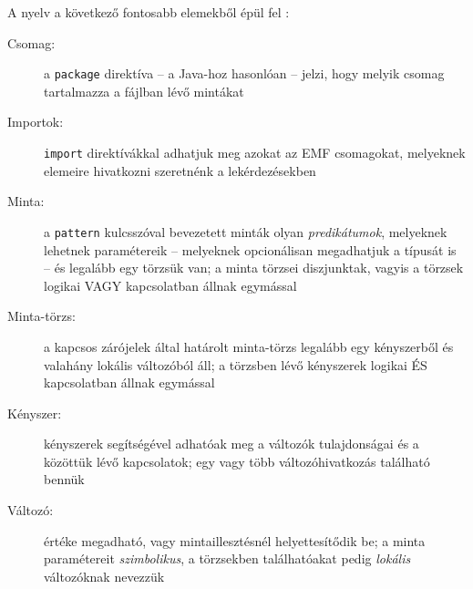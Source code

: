 A nyelv a következő fontosabb elemekből épül fel \cite{EclipseOrgIncQueryLang}:
\begin{description}
\item[Csomag:] a \texttt{package} direktíva -- a Java-hoz hasonlóan -- jelzi, hogy melyik csomag tartalmazza a fájlban lévő mintákat
\item[Importok:] \texttt{import} direktívákkal adhatjuk meg azokat az \gls{EMF} csomagokat, melyeknek elemeire hivatkozni szeretnénk a lekérdezésekben
\item[Minta:] a \texttt{pattern} kulcsszóval bevezetett minták olyan \emph{predikátumok}, melyeknek lehetnek paramétereik -- melyeknek opcionálisan megadhatjuk a típusát is -- és legalább egy törzsük van; a minta törzsei diszjunktak, vagyis a törzsek logikai VAGY kapcsolatban állnak egymással
\item[Minta-törzs:] a kapcsos zárójelek által határolt minta-törzs legalább egy kényszerből és valahány lokális változóból áll; a törzsben lévő kényszerek logikai ÉS kapcsolatban állnak egymással 
\item[Kényszer:] kényszerek segítségével adhatóak meg a változók tulajdonságai és a közöttük lévő kapcsolatok; egy vagy több változóhivatkozás található bennük
\item[Változó:] értéke megadható, vagy mintaillesztésnél helyettesítődik be; a minta paramétereit \emph{szimbolikus}, a törzsekben találhatóakat pedig \emph{lokális} változóknak nevezzük
\end{description}

